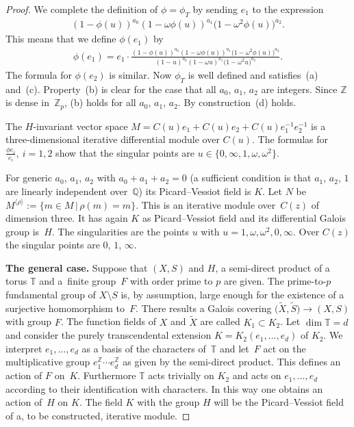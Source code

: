 \documentclass[pdftex]{sigma}
\numberwithin{equation}{section}
\begin{document}
\begin{proof}
We complete the definition of $\phi=\phi_T$ by sending $e_1$ to the expression
\begin{gather*}
(1-\phi(u))^{a_0}(1-\omega \phi(u))^{a_1}\big(1-\omega^2\phi(u)\big)^{a_2}.
\end{gather*} This means that we define $\phi (e_1)$ by
 \begin{gather*} \phi (e_1)=e_1\cdot \frac{(1-\phi(u))^{a_0}(1-\omega \phi(u))^{a_1}\big(1-\omega^2\phi(u)\big)^{a_2}}{(1-u)^{a_0}(1-\omega
 u)^{a_1}\big(1-\omega^2u\big)^{a_2}}.\end{gather*}
The formula for $\phi(e_2)$ is similar. Now $\phi_T$ is well defined and satisfies~(a) and~(c). Property~(b) is clear for the case that all $a_0$, $a_1$, $a_2$ are integers. Since $\mathbb{Z}$ is dense in~$\mathbb{Z}_p$, (b) holds for all $a_0$, $a_1$, $a_2$. By construction~(d) holds.

The $H$-invariant vector space $M=C(u)e_1+C(u)e_2+C(u)e_1^{-1}e_2^{-1}$ is a three-dimensional iterative differential module over $C(u)$. The formulas for $\frac{\phi e_i}{e_i},\ i=1,2$ show that the singular points are $u\in \big\{0,\infty, 1,\omega, \omega^2\big\}$.

For generic $a_0$, $a_1$, $a_2$ with $a_0+a_1+a_2=0$ (a sufficient condition is that $a_1$, $a_2$, $1$ are linearly independent over~$\mathbb{Q}$) its Picard--Vessiot field is
$K$. Let $N$ be $M^{\langle \rho \rangle}:=\{m\in M\, | \, \rho(m)=m\}$. This is an iterative module over~$C(z)$ of dimension three. It has again $K$ as Picard--Vessiot field and its differential Galois group is~$H$. The singularities are the points $u$ with $u=1,\omega, \omega^2, 0, \infty$. Over $C(z)$ the singular points are $0$, $1$, $\infty$.

{\bf The general case.} Suppose that $(X,S)$ and $H$, a semi-direct product of a torus $\mathbb{T}$ and a~finite group~$F$ with order prime to $p$ are given. The prime-to-$p$ fundamental group of $X\setminus S$ is, by assumption, large enough for the existence of a surjective homomorphism to~$F$. There results a Galois covering $\big(\tilde{X},\tilde{S}\big)\rightarrow (X,S)$ with group $F$. The function fields of $X$ and $\tilde{X}$ are called \mbox{$K_1\subset K_2$}. Let $\dim \mathbb{T}=d$ and consider the purely transcendental extension $K=K_2(e_1,\dots ,e_d)$ of $K_2$. We interpret $e_1,\dots ,e_d$ as a basis of the characters of~$\mathbb{T}$ and let~$F$ act on the multiplicative group $e_1^\mathbb{Z} \cdots e_d^\mathbb{Z}$ as given by the semi-direct product. This defines an action of $F$ on~$K$. Furthermore $\mathbb{T}$ acts trivially on $K_2$ and acts on $e_1,\dots, e_d$ according to their identification with characters. In this way one obtains an action of~$H$ on $K$. The field $K$ with the group $H$ will be the Picard--Vessiot field of a, to be constructed, iterative module.


\end{proof}
\end{document}
